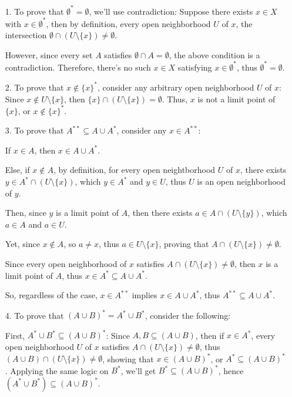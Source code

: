 \documentclass{article}
\begin{document}
\begin{itemize}
    \item[1.] To prove that $\emptyset^*=\emptyset$, we'll use contradiction: Suppose there exists $x\in X$ with $x\in \emptyset^*$,
    then by definition, every open neighborhood $U$ of $x$, the intersection $\emptyset \cap (U\setminus \{x\})\neq \emptyset$.

    However, since every set $A$ satisfies $\emptyset \cap A=\emptyset$, the above condition is a contradiction. Therefore, there's no such $x\in X$ satisfying $x\in\emptyset^*$,
    thus $\emptyset^*=\emptyset$.

    \hfill

    \item[2.] To prove that $x\notin\{x\}^*$, consider any arbitrary open neighborhood $U$ of $x$: Since $x\notin U\setminus\{x\}$, 
    then $\{x\}\cap (U\setminus \{x\})=\emptyset$. Thus, $x$ is not a limit point of $\{x\}$, or $x\notin \{x\}^*$.

    \hfill

    \item[3.] To prove that $A^{**}\subseteq A\cup A^*$, consider any $x\in A^{**}$:
    
    If $x\in A$, then $x\in A\cup A^*$.

    Else, if $x\notin A$, by definition, for every open neightborhood $U$ of $x$, there exists $y\in A^*\cap (U\setminus\{x\})$, 
    which $y\in A^*$ and $y\in U$, thus $U$ is an open neighborhood of $y$.

    Then, since $y$ is a limit point of $A$, then there exists $a\in A\cap (U\setminus \{y\})$, which $a\in A$ and $a\in U$.

    Yet, since $x\notin A$, so $a\neq x$, thus $a\in U\setminus \{x\}$, proving that $A\cap (U\setminus\{x\})\neq \emptyset$.

    Since every open neighborhood of $x$ satisfies $A\cap (U\setminus\{x\})\neq \emptyset$, then $x$ is a limit point of $A$, thus $x\in A^*\subseteq A\cup A^*$.

    So, regardless of the case, $x\in A^{**}$ implies $x\in A\cup A^*$, thus $A^{**}\subseteq A\cup A^*$.

    \hfill

    \item[4.] To prove that $(A\cup B)^* = A^*\cup B^*$, consider the following:
    
    First, $A^*\cup B^*\subseteq (A\cup B)^*$: Since $A,B\subseteq (A\cup B)$, then if $x\in A^*$, every open neighborhood $U$ of $x$ satisfies $A\cap (U\setminus\{x\})\neq \emptyset$,
    thus $(A\cup B)\cap (U\setminus\{x\})\neq \emptyset$, showing that $x\in (A\cup B)^*$, or $A^*\subseteq (A\cup B)^*$. 
    Applying the same logic on $B^*$, we'll get $B^*\subseteq (A\cup B)^*$, hence $(A^*\cup B^*)\subseteq (A\cup B)^*$.


\end{itemize}
\end{document}
